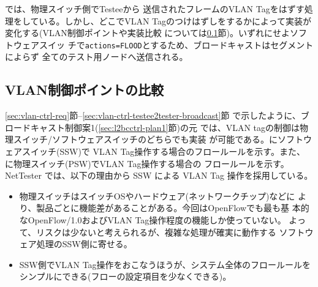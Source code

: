 では、物理スイッチ側でTesteeから
送信されたフレームのVLAN Tagをはずす処理をしている。しかし、どこでVLAN
Tagのつけはずしをするかによって実装が変化する(VLAN制御ポイントや実装比較
については\ref{sec:vlan_control_point}節)。いずれにせよソフトウェアスイッ
チで\verb|actions=FLOOD|とするため、ブロードキャストはセグメントによらず
全てのテスト用ノードへ送信される。

  \subsection{VLAN制御ポイントの比較}
  \label{sec:vlan_control_point}

\ref{sec:vlan-ctrl-req}節--\ref{sec:vlan-ctrl-testee2tester-broadcast}節
で示したように、ブロードキャスト制御案1(\ref{sec:l2bcctrl-plan1}節)の元
では、VLAN tagの制御は物理スイッチ/ソフトウェアスイッチのどちらでも実装
が可能である。にソフトウェアスイッチ(SSW)で
VLAN Tag操作する場合のフロールールを示す。また、
に物理スイッチ(PSW)でVLAN Tag操作する場合の
フロールールを示す。NetTester では、以下の理由から SSW による VLAN Tag
操作を採用している。
\begin{itemize}
 \item 物理スイッチはスイッチOSやハードウェア(ネットワークチップ)などに
       より、製品ごとに機能差があることがある。今回はOpenFlowでも最も基
       本的なOpenFlow/1.0およびVLAN Tag操作程度の機能しか使っていない。
       よって、リスクは少ないと考えられるが、複雑な処理が確実に動作する
       ソフトウェア処理のSSW側に寄せる。
 \item SSW側でVLAN Tag操作をおこなうほうが、システム全体のフロールールを
       シンプルにできる(フローの設定項目を少なくできる)。
\end{itemize}


